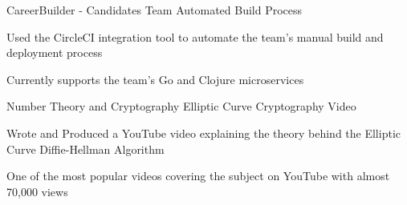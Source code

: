 \begin{cventries}
  \cventry
   	{CareerBuilder - Candidates Team} %
    {Automated Build Process} %
    {} %
    {} %
    {
      \begin{cvitems} %
        \item {Used the CircleCI integration tool to automate the team's manual build and deployment process}
        \item {Currently supports the team's Go and Clojure microservices}
    	\end{cvitems}
	}
    
    \cventry
    {Number Theory and Cryptography} %
    {Elliptic Curve Cryptography Video} %
    {} %
    {} %
    {
      \begin{cvitems} %
        \item {Wrote and Produced a YouTube video explaining the theory behind the Elliptic Curve Diffie-Hellman Algorithm}
        \item {One of the most popular videos covering the subject on YouTube with almost 70,000 views}
      \end{cvitems}
    }

\end{cventries}
